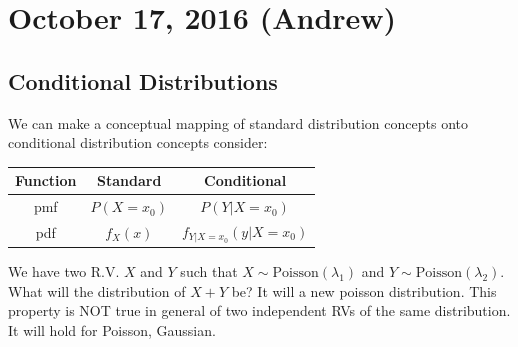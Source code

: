 \documentclass[11pt]{article}
\theoremstyle{definition}
\begin{document}
\section{October 17, 2016 (Andrew)}
\subsection{Conditional Distributions}
We can make a conceptual mapping of standard distribution concepts onto conditional distribution concepts consider:
\begin{table}[h]
\centering
\begin{tabular}{|c|c|c|}
\hline
Function & Standard & Conditional\\
\hline
pmf & $P(X = x_0)$ & $P(Y|X = x_0)$\\
\hline
pdf & $f_X(x)$ & $f_{Y|X=x_0}(y|X=x_0)$\\
\hline
\end{tabular}
\end{table}
\example We have two R.V. $X$ and $Y$ such that $X\sim \mathrm{Poisson}(\lambda_1)$ and $Y\sim \mathrm{Poisson}(\lambda_2)$. What will the distribution of $X + Y$ be? It will a new poisson distribution. This property is NOT true in general of two independent RVs of the same distribution. It will hold for Poisson, Gaussian. 
\end{document}
